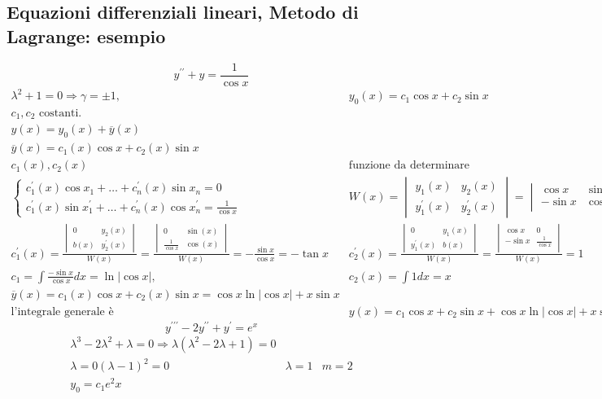 \subsection{Equazioni differenziali lineari, Metodo di Lagrange: esempio}
\begin{equation*}
	y^{\prime\prime}+y=\frac{1}{\cos x}
\end{equation*}
\begin{eqnarray*}
	\lambda^2+1=0\Rightarrow \gamma=\pm1,&y_0(x)=c_1\cos x+c_2\sin x\\
	c_1,c_2\text{ costanti}.\\
	y(x)=y_0(x)+\overline{y}(x)\\
	\overline{y}(x)=c_1(x)\cos x+c_2(x)\sin x\\
	c_1(x),c_2(x)&\text{funzione da determinare}\\
	\begin{cases}
		c_1^\prime(x)\cos x_1+\dots+c_n^\prime(x)\sin x_n=0\\
		c_1^\prime(x)\sin x_1^\prime+\dots+c_n^\prime(x)\cos x_n^\prime=\frac{1}{\cos x}
	\end{cases}&W(x)=\begin{vmatrix}
		y_1(x)&y_2(x)\\
		y^\prime_1(x)&y^\prime_2(x)
	\end{vmatrix}=\begin{vmatrix}
		\cos x&\sin x\\
		-\sin x&\cos x\\
	\end{vmatrix}=1\\
	c_1^\prime(x)=\frac{\begin{vmatrix}
		0&y_2(x)\\
		b(x)&y^\prime_2(x)
	\end{vmatrix}}{W(x)}=\frac{\begin{vmatrix}
		0&\sin(x)\\
		\frac{1}{\cos x}&\cos(x)
	\end{vmatrix}}{W(x)}=-\frac{\sin x}{\cos x}=-\tan x&c_2^\prime(x)=\frac{\begin{vmatrix}
		0&y_1(x)\\
		y^\prime_1(x)&b(x)
	\end{vmatrix}}{W(x)}=\frac{\begin{vmatrix}
		\cos x&0\\
		-\sin x&\frac{1}{\cos x}\\
	\end{vmatrix}}{W(x)}=1\\
	c_1=\int\frac{-\sin x}{\cos x}dx=\ln|\cos x|,&c_2(x)=\int 1dx=x\\
	\overline{y}(x)=c_1(x)\cos x+c_2(x)\sin x=\cos x \ln|\cos x|+x\sin x\\
	\text{l'integrale generale è}&y(x)=c_1\cos x+c_2\sin x+\cos x\ln|\cos x|+x\sin x
\end{eqnarray*}
\begin{equation}
	y^{\prime\prime\prime}-2y^{\prime\prime}+y^\prime=e^x
\end{equation}
\begin{eqnarray*}
	\lambda^3-2\lambda^2+\lambda=0\Rightarrow\lambda(\lambda^2-2\lambda+1)=0\\
	\lambda=0(\lambda-1)^2=0&\lambda=1&m=2\\
	y_0=c_1e^2x
\end{eqnarray*}
